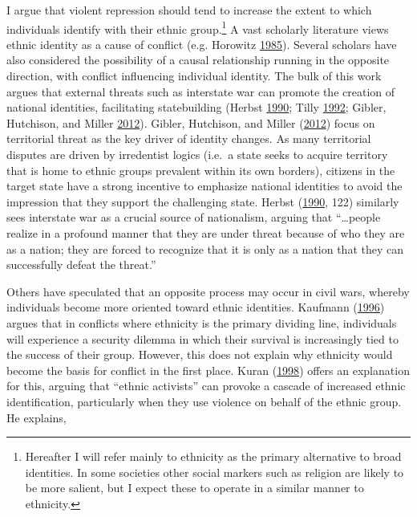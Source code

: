\documentclass[12pt,]{book}
\let\rmarkdownfootnote\footnote%
\def\footnote{\protect\rmarkdownfootnote}
\theoremstyle{definition}
\theoremstyle{definition}
\theoremstyle{definition}
\theoremstyle{remark}
\begin{document}
I argue that violent repression should tend to increase the extent to
which individuals identify with their ethnic group.\footnote{Hereafter I
  will refer mainly to ethnicity as the primary alternative to broad
  identities. In some societies other social markers such as religion
  are likely to be more salient, but I expect these to operate in a
  similar manner to ethnicity.} A vast scholarly literature views ethnic
identity as a cause of conflict (e.g. Horowitz
\protect\hyperlink{ref-horowitz85}{1985}). Several scholars have also
considered the possibility of a causal relationship running in the
opposite direction, with conflict influencing individual identity. The
bulk of this work argues that external threats such as interstate war
can promote the creation of national identities, facilitating
statebuilding (Herbst \protect\hyperlink{ref-Herbst1990}{1990}; Tilly
\protect\hyperlink{ref-Tilly1992}{1992}; Gibler, Hutchison, and Miller
\protect\hyperlink{ref-Gibler2012}{2012}). Gibler, Hutchison, and Miller
(\protect\hyperlink{ref-Gibler2012}{2012}) focus on territorial threat
as the key driver of identity changes. As many territorial disputes are
driven by irredentist logics (i.e.~a state seeks to acquire territory
that is home to ethnic groups prevalent within its own borders),
citizens in the target state have a strong incentive to emphasize
national identities to avoid the impression that they support the
challenging state. Herbst (\protect\hyperlink{ref-Herbst1990}{1990},
122) similarly sees interstate war as a crucial source of nationalism,
arguing that ``\ldots{}people realize in a profound manner that they are
under threat because of who they are as a nation; they are forced to
recognize that it is only as a nation that they can successfully defeat
the threat.''

Others have speculated that an opposite process may occur in civil wars,
whereby individuals become more oriented toward ethnic identities.
Kaufmann (\protect\hyperlink{ref-Kaufmann1996}{1996}) argues that in
conflicts where ethnicity is the primary dividing line, individuals will
experience a security dilemma in which their survival is increasingly
tied to the success of their group. However, this does not explain why
ethnicity would become the basis for conflict in the first place. Kuran
(\protect\hyperlink{ref-Kuran1998}{1998}) offers an explanation for
this, arguing that ``ethnic activists'' can provoke a cascade of
increased ethnic identification, particularly when they use violence on
behalf of the ethnic group. He explains,
\end{document}
